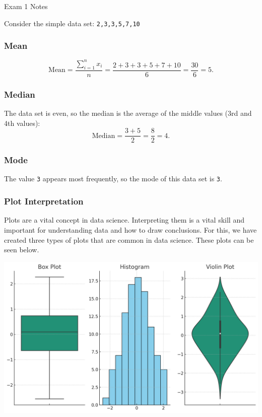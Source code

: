 \begin{examnotes}{Exam 1 Notes}
    \begin{highlight}
        Consider the simple data set: \texttt{2,3,3,5,7,10}
        \subsubsection*{Mean}
        \begin{equation*}
            \text{Mean} = \frac{\sum_{i = 1}^{n} x_{i}}{n} = \frac{2 + 3 + 3 + 5 + 7 + 10}{6} = \frac{30}{6} = 5.
        \end{equation*}
        \subsubsection*{Median}
        The data set is even, so the median is the average of the middle values (3rd and 4th values):
        \begin{equation*}
            \text{Median} = \frac{3 + 5}{2} = \frac{8}{2} = 4.
        \end{equation*}
        \subsubsection*{Mode}
        The value \texttt{3} appears most frequently, so the mode of this data set is \texttt{3}.
    \end{highlight}

    \subsubsection*{Plot Interpretation}

    Plots are a vital concept in data science. Interpreting them is a vital skill and important for understanding data and how to draw conclusions. For this, we have created three types of plots that
    are common in data science. These plots can be seen below.

    \begin{center}
        \includegraphics[scale=0.5]{Images/Plot Interpretation.png}
    \end{center}


\end{examnotes}
